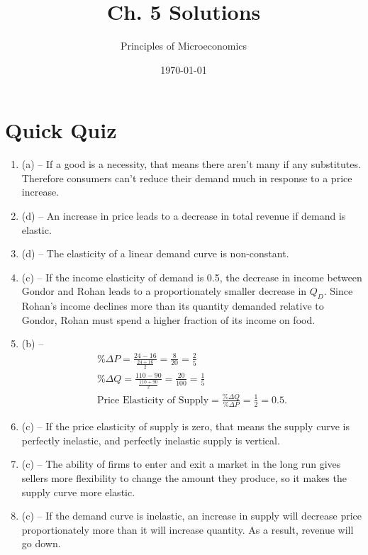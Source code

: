 \documentclass{article}
\title{Ch. 5 Solutions}
\author{Principles of Microeconomics}
\date{\today}
\begin{document}
\maketitle

\section*{Quick Quiz}

\begin{enumerate}

\item (a) -- If a good is a necessity, that means there aren't many if any substitutes. Therefore consumers can't reduce their demand much in response to a price increase. 

\item (d) -- An increase in price leads to a decrease in total revenue if demand is elastic.

\item (d) -- The elasticity of a linear demand curve is non-constant.

\item (c) -- If the income elasticity of demand is 0.5, the decrease in income between Gondor and Rohan leads to a proportionately smaller decrease in $Q_D$. Since Rohan's income declines more than its quantity demanded relative to Gondor, Rohan must spend a higher fraction of its income on food. 

\item (b) --
	\begin{gather*}
	\% \Delta P = \frac{24 - 16}{\frac{24 + 16}{2}} = \frac{8}{20} = \frac{2}{5} \\
	\% \Delta Q = \frac{110 - 90}{\frac{110 + 90}{2}} =  \frac{20}{100} = \frac{1}{5} \\
	\text{Price Elasticity of Supply} = \frac{\% \Delta Q}{\% \Delta P} = \frac{1}{2} = 0.5.
	\end{gather*}
	
\item (c) -- If the price elasticity of supply is zero, that means the supply curve is perfectly inelastic, and perfectly inelastic supply is vertical.

\item (c) -- The ability of firms to enter and exit a market in the long run gives sellers more flexibility to change the amount they produce, so it makes the supply curve more elastic.

\item (c) -- If the demand curve is inelastic, an increase in supply will decrease price proportionately more than it will increase quantity. As a result, revenue will go down.


\end{enumerate}
\end{document}
